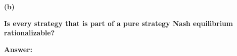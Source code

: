 \documentclass[letterpaper,11pt]{article}
\begin{document}
\begin{addmargin}[-1.1em]{0em}
\textbf{(b)}\par\end{addmargin}
  \textbf{Is every strategy that is part of a pure strategy Nash equilibrium rationalizable?
}\par
   \textbf{}\par
 \bigbreak
 \begin{addmargin}[-0.5em]{0em}
 \textbf{Answer: }\end{addmargin}
\end{document}
